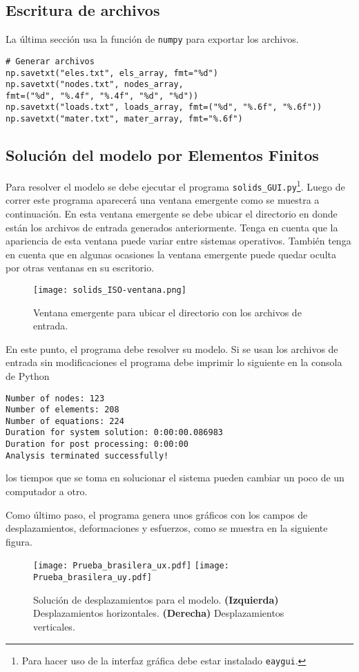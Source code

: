 \subsection{Escritura de archivos}
La última sección usa la función  de \texttt{numpy} para exportar los archivos.
\begin{verbatim}
# Generar archivos
np.savetxt("eles.txt", els_array, fmt="%d")
np.savetxt("nodes.txt", nodes_array,
fmt=("%d", "%.4f", "%.4f", "%d", "%d"))
np.savetxt("loads.txt", loads_array, fmt=("%d", "%.6f", "%.6f"))
np.savetxt("mater.txt", mater_array, fmt="%.6f")
\end{verbatim}


\subsection{Solución del modelo por Elementos Finitos}
Para resolver el modelo se debe ejecutar el programa \texttt{solids\_GUI.py}\footnote{Para hacer uso de la interfaz gráfica debe estar instalado \texttt{eaygui}.}. Luego de correr este programa aparecerá una ventana emergente como se muestra a continuación. En esta ventana emergente se debe ubicar el directorio en donde están los archivos de entrada generados anteriormente. Tenga en cuenta que la apariencia de esta ventana puede variar entre sistemas operativos. También tenga en cuenta que en algunas ocasiones la ventana emergente puede quedar oculta por otras ventanas en su escritorio.
\begin{figure}[H]
    \centering
    \texttt{[image: solids\_ISO-ventana.png]} 
    \caption{Ventana emergente para ubicar el directorio con los archivos de entrada.}
\end{figure}

En este punto, el programa debe resolver su modelo. Si se usan los archivos de entrada sin modificaciones el programa debe imprimir lo siguiente en la consola de Python
\begin{verbatim}
Number of nodes: 123
Number of elements: 208
Number of equations: 224
Duration for system solution: 0:00:00.086983
Duration for post processing: 0:00:00
Analysis terminated successfully!
\end{verbatim}
los tiempos que se toma en solucionar el sistema pueden cambiar un poco de un computador a otro.

Como último paso, el programa genera unos gráficos con los campos de desplazamientos, deformaciones y esfuerzos, como se muestra en la siguiente figura.
\begin{figure}[H]
    \centering
    \texttt{[image: Prueba\_brasilera\_ux.pdf]} 
    \texttt{[image: Prueba\_brasilera\_uy.pdf]}
    \caption{Solución de desplazamientos para el modelo. \textbf{(Izquierda)} Desplazamientos horizontales.
    \textbf{(Derecha)} Desplazamientos verticales.}
\end{figure}



